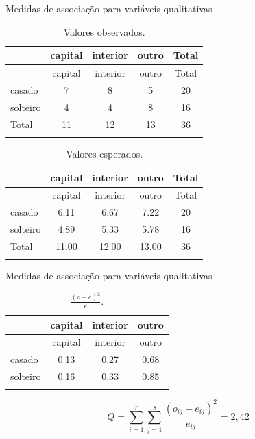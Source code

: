 \documentclass[
  ignorenonframetext,
  serif,
  professionalfont,
  usenames,
  dvipsnames,
  aspectratio = 169]{beamer}
\begin{document}
\begin{frame}{Medidas de associação para variáveis qualitativas}
\label{medidas-de-associauxe7uxe3o-para-variuxe1veis-qualitativas-2}
\begin{longtable}[]{@{}lcccc@{}}
\caption{Valores observados.}\tabularnewline
\toprule\noalign{}
& capital & interior & outro & Total \\
\midrule\noalign{}
\endfirsthead
\toprule\noalign{}
& capital & interior & outro & Total \\
\midrule\noalign{}
\endhead
casado & 7 & 8 & 5 & 20 \\
solteiro & 4 & 4 & 8 & 16 \\
Total & 11 & 12 & 13 & 36 \\
\bottomrule\noalign{}
\end{longtable}

\begin{longtable}[]{@{}lcccc@{}}
\caption{Valores esperados.}\tabularnewline
\toprule\noalign{}
& capital & interior & outro & Total \\
\midrule\noalign{}
\endfirsthead
\toprule\noalign{}
& capital & interior & outro & Total \\
\midrule\noalign{}
\endhead
casado & 6.11 & 6.67 & 7.22 & 20 \\
solteiro & 4.89 & 5.33 & 5.78 & 16 \\
Total & 11.00 & 12.00 & 13.00 & 36 \\
\bottomrule\noalign{}
\end{longtable}
\end{frame}

\begin{frame}{Medidas de associação para variáveis qualitativas}
\label{medidas-de-associauxe7uxe3o-para-variuxe1veis-qualitativas-3}
\begin{longtable}[]{@{}lccc@{}}
\caption{\(\frac{(o-e)^2}{e}\).}\tabularnewline
\toprule\noalign{}
& capital & interior & outro \\
\midrule\noalign{}
\endfirsthead
\toprule\noalign{}
& capital & interior & outro \\
\midrule\noalign{}
\endhead
casado & 0.13 & 0.27 & 0.68 \\
solteiro & 0.16 & 0.33 & 0.85 \\
\bottomrule\noalign{}
\end{longtable}

\[Q = \sum_{i=1}^{r} \sum_{j=1}^{s} \frac{(o_{ij} - e_{ij})^2}{e_{ij}} = 2,42\]
\end{frame}
\end{document}
